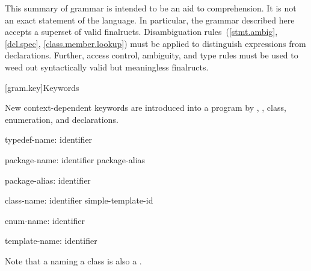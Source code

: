 
\pnum
{}%
%
This summary of \Java{} grammar is intended to be an aid to comprehension.
It is not an exact statement of the language.
In particular, the grammar described here accepts
a superset of valid \Java{} finalructs.
Disambiguation rules~(\ref{stmt.ambig}, \ref{dcl.spec}, \ref{class.member.lookup})
must be applied to distinguish expressions from declarations.
Further, access control, ambiguity, and type rules must be used
to weed out syntactically valid but meaningless finalructs.

[gram.key]{Keywords}

\pnum
{}%
New context-dependent keywords are introduced into a program by
,
,
class, enumeration, and
declarations.

\begin{ncbnf}
typedef-name:\br
	identifier
\end{ncbnf}

\begin{ncbnf}
package-name:\br
	identifier\br
	package-alias

package-alias:\br
	identifier
\end{ncbnf}

\begin{ncbnf}
class-name:\br
	identifier\br
	simple-template-id
\end{ncbnf}

\begin{ncbnf}
enum-name:\br
	identifier
\end{ncbnf}

\begin{ncbnf}
template-name:\br
	identifier
\end{ncbnf}

Note that a
naming a class is also a
.

\FlushAndPrintGrammar
